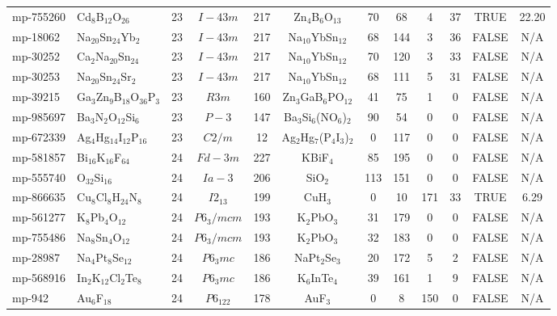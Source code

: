 {\begin{longtable}{llcccccccccc}
    mp-755260 & Cd$_{8}$B$_{12}$O$_{26}$ & 23    & $I-43m$ & 217   & Zn$_{4}$B$_{6}$O$_{13}$ & 70    & 68    & 4     & 37    & TRUE  & 22.20  \\
    mp-18062 & Na$_{20}$Sn$_{24}$Yb$_{2}$ & 23    & $I-43m$ & 217   & Na$_{10}$YbSn$_{12}$ & 68    & 144   & 3     & 36    & FALSE & N/A \\
    mp-30252 & Ca$_{2}$Na$_{20}$Sn$_{24}$ & 23    & $I-43m$ & 217   & Na$_{10}$YbSn$_{12}$ & 70    & 120   & 3     & 33    & FALSE & N/A \\
    mp-30253 & Na$_{20}$Sn$_{24}$Sr$_{2}$ & 23    & $I-43m$ & 217   & Na$_{10}$YbSn$_{12}$ & 68    & 111   & 5     & 31    & FALSE & N/A \\
    mp-39215 & Ga$_{3}$Zn$_{9}$B$_{18}$O$_{36}$P$_{3}$ & 23    & $R3m$ & 160   & Zn$_{3}$GaB$_{6}$PO$_{12}$ & 41    & 75    & 1     & 0     & FALSE & N/A \\
    mp-985697 & Ba$_{3}$N$_{2}$O$_{12}$Si$_{6}$ & 23    & $P-3$ & 147   & Ba$_{3}$Si$_{6}$(NO$_{6}$)$_{2}$ & 90    & 54    & 0     & 0     & FALSE & N/A \\
    mp-672339 & Ag$_{4}$Hg$_{14}$I$_{12}$P$_{16}$ & 23    & $C2/m$ & 12    & Ag$_{2}$Hg$_{7}$(P$_{4}$I$_{3}$)$_{2}$ & 0     & 117   & 0     & 0     & FALSE & N/A \\
    mp-581857 & Bi$_{16}$K$_{16}$F$_{64}$ & 24    & $Fd-3m$ & 227   & KBiF$_{4}$ & 85    & 195   & 0     & 0     & FALSE & N/A \\
    mp-555740 & O$_{32}$Si$_{16}$ & 24    & $Ia-3$ & 206   & SiO$_{2}$ & 113   & 151   & 0     & 0     & FALSE & N/A \\
    mp-866635 & Cu$_{8}$Cl$_{8}$H$_{24}$N$_{8}$ & 24    & $I2_13$ & 199   & CuH$_{3}$ & 0     & 10    & 171   & 33    & TRUE  & 6.29  \\
    mp-561277 & K$_{8}$Pb$_{4}$O$_{12}$ & 24    & $P6_3/mcm$ & 193   & K$_{2}$PbO$_{3}$ & 31    & 179   & 0     & 0     & FALSE & N/A \\
    mp-755486 & Na$_{8}$Sn$_{4}$O$_{12}$ & 24    & $P6_3/mcm$ & 193   & K$_{2}$PbO$_{3}$ & 32    & 183   & 0     & 0     & FALSE & N/A \\
    mp-28987 & Na$_{4}$Pt$_{8}$Se$_{12}$ & 24    & $P6_3mc$ & 186   & NaPt$_{2}$Se$_{3}$ & 20    & 172   & 5     & 2     & FALSE & N/A \\
    mp-568916 & In$_{2}$K$_{12}$Cl$_{2}$Te$_{8}$ & 24    & $P6_3mc$ & 186   & K$_{6}$InTe$_{4}$ & 39    & 161   & 1     & 9     & FALSE & N/A \\
    mp-942 & Au$_{6}$F$_{18}$ & 24    & $P6_122$ & 178   & AuF$_{3}$ & 0     & 8     & 150   & 0     & FALSE & N/A \\

\end{longtable}}
